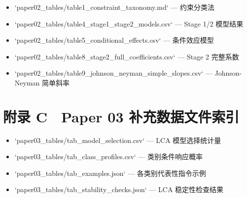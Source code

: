 \documentclass[12pt,a4paper,openany,oneside]{ctexrep}
\begin{document}
\begin{itemize}
\item `paper02\_tables/table1\_constraint\_taxonomy.md` — 约束分类法
\item `paper02\_tables/table4\_stage1\_stage2\_models.csv` — Stage 1/2 模型结果
\item `paper02\_tables/table5\_conditional\_effects.csv` — 条件效应模型
\item `paper02\_tables/table8\_stage2\_full\_coefficients.csv` — Stage 2 完整系数
\item `paper02\_tables/table9\_johnson\_neyman\_simple\_slopes.csv` — Johnson-Neyman 简单斜率
\end{itemize}


\section{附录 C　Paper 03 补充数据文件索引}


\begin{itemize}
\item `paper03\_tables/tab\_model\_selection.csv` — LCA 模型选择统计量
\item `paper03\_tables/tab\_class\_profiles.csv` — 类别条件响应概率
\item `paper03\_tables/tab\_examples.json` — 各类别代表性指令示例
\item `paper03\_tables/tab\_stability\_checks.json` — LCA 稳定性检查结果
\end{itemize}
\end{document}
